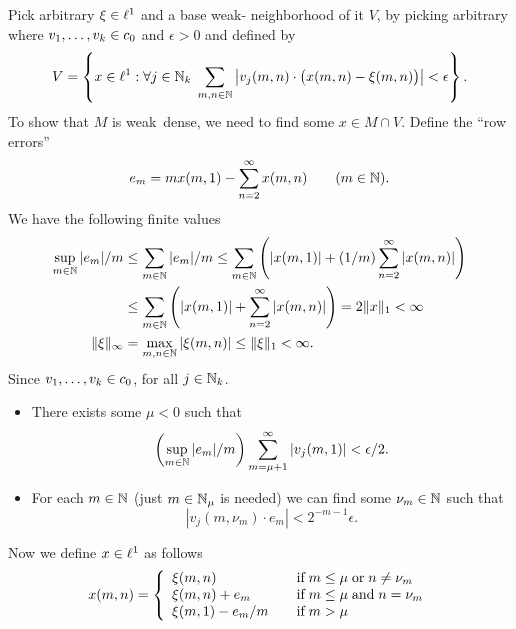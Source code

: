 \begin{enumerate}
\begin{itemize}
Pick arbitrary \(\xi\in\ell^1\) and a base weak\upstar- neighborhood of
it $V$, by picking arbitrary
where \(v_1,\ldots,v_{k}\in c_0\) and \(\epsilon > 0\) and
defined by
\begin{equation*}
V = \left\{ x\in\ell^1: \forall j\in\mathbb{N}_k\;
      \sum_{m,n\in\mathbb{N}}
        \left| v_j(m,n) \cdot \bigl(x(m,n) - \xi(m,n)\bigr) \right|
      < \epsilon
    \right\}.
\end{equation*}
To show that $M$ is weak\upstar\ dense, we need to find some \(x\in M\cap V\).
Define the ``row errors''
\begin{equation*}
e_m = mx(m,1) - \sum_{n=2}^\infty x(m,n) \qquad (m \in \mathbb{N}).
\end{equation*}
We have the following finite values
\begin{align*}
\sup_{m\in\mathbb{N}} |e_m|/m &\leq \sum_{m\in\mathbb{N}} |e_m|/m
   \leq \sum_{m\in\mathbb{N}} \left(|x(m,1)| + (1/m)\sum_{n=2}^\infty |x(m,n)|\right) \\
  &\leq \sum_{m\in\mathbb{N}} \left(|x(m,1)| + \sum_{n=2}^\infty |x(m,n)|\right)
   = 2\|x\|_1 < \infty \\
\|\xi\|_\infty &= \max_{m,n\in\mathbb{N}} |\xi(m,n)| \leq \|\xi\|_1 < \infty.
\end{align*}
Since \(v_1,\ldots,v_{k}\in c_0\), for all \(j\in\mathbb{N}_k\).
\begin{itemize}
\item
There exists some \(\mu<0\) such that
\begin{equation*}
\left(\sup_{m\in\mathbb{N}} |e_m|/m\right)\sum_{m=\mu+1}^\infty |v_j(m,1)| < \epsilon/2.
\end{equation*}
\item
For each \(m\in\mathbb{N}\)
(just \(m\in\mathbb{N}_\mu\) is needed)
we can find some \(\nu_m\in\mathbb{N}\)
such that
\begin{equation*}
|v_j(m,\nu_m)\cdot e_m| < 2^{-m-1}\epsilon.
\end{equation*}
\end{itemize}
Now we define \(x\in\ell^1\) as follows
\begin{equation*}
x(m,n) =
\left\{
 \begin{array}{ll}
 \xi(m,n) \quad &
    \textnormal{if}\; m \leq \mu \;\textnormal{or}\; n \neq \nu_m \\
 \xi(m,n) + e_m \quad &
    \textnormal{if}\;  m \leq \mu \;\textnormal{and}\;n = \nu_m \\
 \xi(m,1) - e_m/m \quad &
    \textnormal{if}\;  m > \mu
 \end{array}
\right.
\end{equation*}

\end{itemize}
\end{enumerate}
